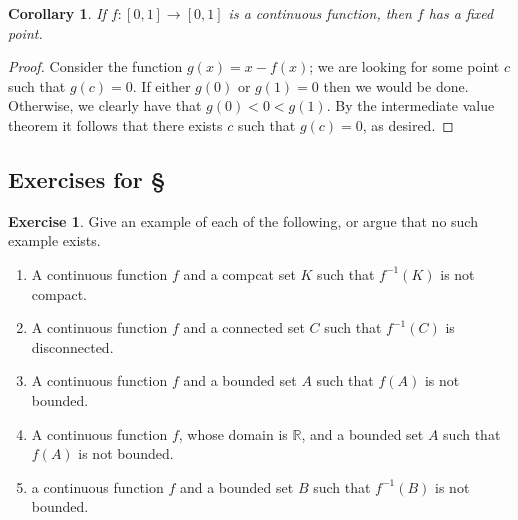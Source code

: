 \documentclass[11pt,oneside]{amsbook}
\newcommand{\RR}{\mathbb R}
\theoremstyle{definition}
\newtheorem{exerc}{Exercise}[section]
\theoremstyle{plain}
\newtheorem{cor}[thm]{Corollary}
\theoremstyle{definition}
\theoremstyle{remark}
\numberwithin{equation}{section}
\numberwithin{figure}{section}
\begin{document}
\begin{cor}
  If $f\colon[0,1]\to[0,1]$ is a continuous function, then $f$ has a fixed point.
\end{cor}

\begin{proof}
  Consider the function $g(x)=x-f(x)$; we are looking for some point $c$ such that $g(c)=0$. If either $g(0)$ or $g(1)=0$ then we would be done. Otherwise, we clearly have that $g(0)<0<g(1)$. By the intermediate value theorem it follows that there exists $c$ such that $g(c)=0$, as desired.
\end{proof}

\newpage
\subsection*{Exercises for \S \thesection}

\begin{exerc}
  Give an example of each of the following, or argue that no such example exists.
  \begin{enumerate}
    \item A continuous function $f$ and a compcat set $K$ such that $f^{-1}(K)$ is not compact.
    \item A continuous function $f$ and a connected set $C$ such that $f^{-1}(C)$ is disconnected.
    \item A continuous function $f$ and a bounded set $A$ such that $f(A)$ is not bounded.
    \item A continuous function $f$, whose domain is $\RR$, and a bounded set $A$ such that $f(A)$ is not bounded.
    \item a continuous function $f$ and a bounded set $B$ such that $f^{-1}(B)$ is not bounded.
  \end{enumerate}
\end{exerc}
  
\end{document}
